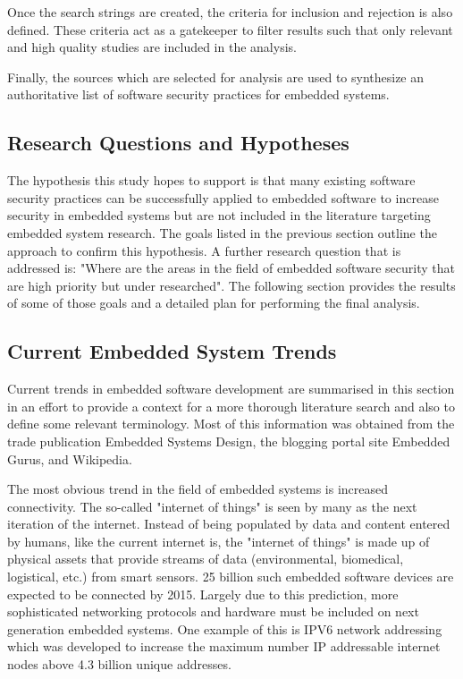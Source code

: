 \documentclass[final,conference,11pt]{IEEEtran}
\begin{document}
Once the search strings are created, the criteria for inclusion and rejection is also defined.  These criteria act as a gatekeeper to filter results such that only relevant and high quality studies are included in the analysis.

Finally, the sources which are selected for analysis are used to synthesize an authoritative list of software security practices for embedded systems.  

\subsection{Research Questions and Hypotheses}

The hypothesis this study hopes to support is that many existing software security practices can be successfully applied to embedded software to increase security in embedded systems but are not included in the literature targeting embedded system research.  The goals listed in the previous section outline the approach to confirm this hypothesis.  A further research question that is addressed is: "Where are the areas in the field of embedded software security that are high priority but under researched". The following section provides the results of some of those goals and a detailed plan for performing the final analysis.

\subsection{Current Embedded System Trends}

Current trends in embedded software development are summarised in this section in an effort to provide a context for a more thorough literature search and also to define some relevant terminology.  Most of this information was obtained from the trade publication Embedded Systems Design, the blogging portal site Embedded Gurus, and Wikipedia.  

The most obvious trend in the field of embedded systems is increased connectivity.  The so-called "internet of things" is seen by many as the next iteration of the internet. Instead of being populated by data and content entered by humans, like the current internet is, the "internet of things" is made up of physical assets that provide streams of data (environmental, biomedical, logistical, etc.) from smart sensors.  25 billion such embedded software devices are expected to be connected by 2015. Largely due to this prediction, more sophisticated networking protocols and hardware must be included on next generation embedded systems.  One example of this is IPV6 network addressing which was developed to increase the maximum number IP addressable internet nodes above 4.3 billion unique addresses.  
\end{document}
